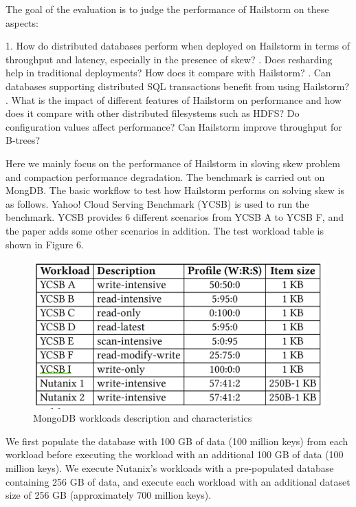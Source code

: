 \documentclass[a4paper,10pt,twoside]{article}
\begin{document}
The goal of the evaluation is to judge the performance of Hailstorm on these aspects:
\begin{displayquote}
1. How do distributed databases perform when deployed
on Hailstorm in terms of throughput and latency, especially
in the presence of skew? 
. Does resharding help in traditional deployments? How
does it compare with Hailstorm?
. Can databases supporting distributed SQL transactions
benefit from using Hailstorm? 
. What is the impact of different features of Hailstorm
on performance and how does it compare with other
distributed filesystems such as HDFS? Do configuration
values affect performance? Can Hailstorm
improve throughput for B-trees?
\end{displayquote}
Here we mainly focus on the performance of Hailstorm in sloving skew problem and compaction performance degradation.
The benchmark is carried out on MongDB.
The basic workflow to test how Hailstorm performs on solving skew is as follows.
Yahoo! Cloud Serving Benchmark (YCSB) is used to run the benchmark.
YCSB provides 6 different scenarios from YCSB A to YCSB F, and the paper adds some other scenarios in addition.
The test workload table is shown in Figure 6.
\begin{figure}[h]
    \centering
	\includegraphics[scale=0.3]{YCSB_workload.png}
    \caption{MongoDB workloads description and characteristics}
    \label{fig:mesh1}
\end{figure}
\begin{displayquote}
	We first populate the database with 100 GB of data (100
	million keys) from each workload before executing the workload
	with an additional 100 GB of data (100 million keys).
	We execute Nutanix’s workloads with a pre-populated database
	containing 256 GB of data, and execute each workload
	with an additional dataset size of 256 GB (approximately 700
	million keys).
\end{displayquote}
\end{document}
